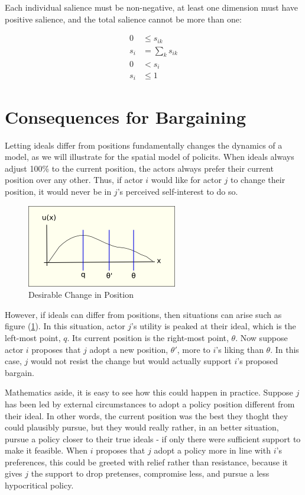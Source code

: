 \documentclass[a4paper,10pt]{article}
\begin{document}
Each individual salience must  be non-negative, at least one dimension must have positive salience,
and the total salience cannot be more than one:

\begin{align}\label{eq:salience} 
  0          & \le s_{ik} \\
  s_i        & = \sum_{k} s_{ik} \\
  0          & < s_i \\
  s_i        & \le  1
\end{align}
  
  
\section{Consequences for Bargaining}

Letting ideals differ from positions fundamentally changes the dynamics of a model,
as we will illustrate for the spatial model of policits.
When ideals always adjust 100\% to the current position, the actors
 always prefer their current position over any other. Thus, if actor $i$ would like
for actor $j$ to change their position, it would never be in $j$'s perceived self-interest
to do so.

\begin{figure}[h]
  \centering
  \includegraphics{./welcome-change.png}
  \caption{Desirable Change in Position}
  \label{fig:welcom-pos-change}
\end{figure}




However, if ideals can differ from positions, then situations can arise such as
figure (\ref{fig:welcom-pos-change}). In this situation, actor $j$'s utility
is peaked at their ideal, which  is the left-most point, $q$. Its current position
is the right-most point, $\theta$. Now suppose actor $i$ proposes that $j$ adopt
a new position, $\theta'$, more to $i$'s liking than $\theta$.
In this case, $j$ would not resist the change but would
actually support $i$'s proposed bargain.

Mathematics aside, it is easy to see   how this could happen in practice. Suppose $j$
has been led by external circumstances to adopt a policy position different from their ideal.
In other words, the current position was the best they thoght they could plausibly
pursue, but 
they would really rather, in an better situation, pursue a  policy closer to their true ideals
- if only there were sufficient support to make it feasible.
When $i$ proposes that $j$ adopt a policy more in line with $i$'s preferences,
this could be greeted with relief rather than resistance, because
it gives $j$ the support to drop pretenses, compromise less,  and pursue a less hypocritical policy.
\end{document}
